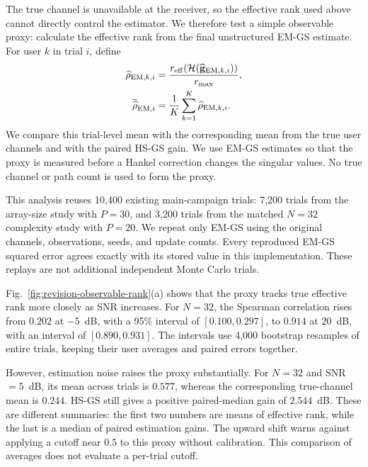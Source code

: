 \documentclass[journal]{IEEEtran}
\begin{document}
The true channel is unavailable at the receiver, so the effective rank
used above cannot directly control the estimator. We therefore test a
simple observable proxy: calculate the effective rank from the final
unstructured EM-GS estimate. For user $k$ in trial $i$, define
\begin{equation}
\begin{aligned}
\widehat\rho_{{\rm EM},k,i}
&=\frac{r_{\rm eff}\!\left(\mathcal H(
  \widehat{\mathbf g}_{{\rm EM},k,i})\right)}{r_{\max}},\\
\overline{\widehat\rho}_{{\rm EM},i}
&=\frac{1}{K}\sum_{k=1}^{K}\widehat\rho_{{\rm EM},k,i}.
\end{aligned}
\label{eq:revision-observable-rho}
\end{equation}
We compare this trial-level mean with the corresponding mean from the
true user channels and with the paired HS-GS gain. We use EM-GS estimates
so that the proxy is measured before a Hankel correction changes the
singular values. No true channel or path count is used to form the proxy.

This analysis reuses 10,400 existing main-campaign trials: 7,200 trials from the
array-size study with $P=30$, and 3,200 trials from the matched $N=32$
complexity study with $P=20$. We repeat only EM-GS using the original
channels, observations, seeds, and update counts. Every reproduced EM-GS
squared error agrees exactly with its stored value in this implementation.
These replays are not additional independent Monte Carlo trials.

Fig.~\ref{fig:revision-observable-rank}(a) shows that the proxy tracks
true effective rank more closely as SNR increases. For $N=32$, the
Spearman correlation rises from $0.202$ at $-5$~dB, with a 95\% interval
of $[0.100,0.297]$, to $0.914$ at $20$~dB, with an interval of
$[0.890,0.931]$. The intervals use 4,000 bootstrap resamples of entire
trials, keeping their user averages and paired errors together.

However, estimation noise raises the proxy substantially. For $N=32$
and SNR $=5$~dB, its mean across trials is $0.577$, whereas the
corresponding true-channel mean is $0.244$. HS-GS still gives a positive
paired-median gain of $2.544$~dB. These are different summaries: the first
two numbers are means of effective rank, while the last is a median of
paired estimation gains. The upward shift warns against applying a cutoff
near $0.5$ to this proxy without calibration. This comparison of averages
does not evaluate a per-trial cutoff.
\end{document}
